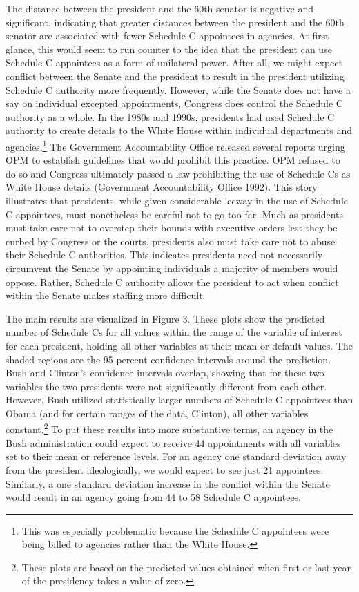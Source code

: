 \documentclass[12pt]{article}
\begin{document}
The distance between the president and the 60th senator is negative and significant, indicating that greater distances between the president and the 60th senator are associated with fewer Schedule C appointees in agencies. At first glance, this would seem to run counter to the idea that the president can use Schedule C appointees as a form of unilateral power. After all, we might expect conflict between the Senate and the president to result in the president utilizing Schedule C authority more frequently. However, while the Senate does not have a say on individual excepted appointments, Congress does control the Schedule C authority as a whole. In the 1980s and 1990s, presidents had used Schedule C authority to create details to the White House within individual departments and agencies.\footnote{This was especially problematic because the Schedule C appointees were being billed to agencies rather than the White House.} The Government Accountability Office released several reports urging OPM to establish guidelines that would prohibit this practice. OPM refused to do so and Congress ultimately passed a law prohibiting the use of Schedule Cs as White House details (Government Accountability Office 1992). This story illustrates that presidents, while given considerable leeway in the use of Schedule C appointees, must nonetheless be careful not to go too far. Much as presidents must take care not to overstep their bounds with executive orders lest they be curbed by Congress or the courts, presidents also must take care not to abuse their Schedule C authorities. This indicates presidents need not necessarily circumvent the Senate by appointing individuals a majority of members would oppose. Rather, Schedule C authority allows the president to act when conflict within the Senate makes staffing more difficult.

The main results are visualized in Figure 3. These plots show the predicted number of Schedule Cs for all values within the range of the variable of interest for each president, holding all other variables at their mean or default values. The shaded regions are the 95 percent confidence intervals around the prediction. Bush and Clinton's confidence intervals overlap, showing that for these two variables the two presidents were not significantly different from each other. However, Bush utilized statistically larger numbers of Schedule C appointees than Obama (and for certain ranges of the data, Clinton), all other variables constant.\footnote{These plots are based on the predicted values obtained when first or last year of the presidency takes a value of zero.} 
To put these results into more substantive terms, an agency in the Bush administration could expect to receive 44 appointments with all variables set to their mean or reference levels. For an agency one standard deviation away from the president ideologically, we would expect to see just 21 appointees. Similarly, a one standard deviation increase in the conflict within the Senate would result in an agency going from 44 to 58 Schedule C appointees.
\end{document}
